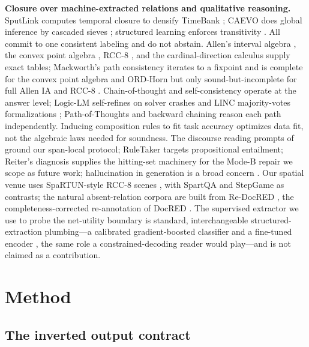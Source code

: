 \documentclass[11pt,letterpaper]{article}
\begin{document}
\textbf{Closure over machine-extracted relations and qualitative reasoning.} SputLink computes temporal closure to densify TimeBank \citep{Verhagen2005}; CAEVO does global inference by cascaded sieves \citep{Chambers2014}; structured learning enforces transitivity \citep{Ning2017}. All commit to one consistent labeling and do not abstain. Allen's interval algebra \citep{Allen1983}, the convex point algebra \citep{Vilain1986}, RCC-8 \citep{Randell1992}, and the cardinal-direction calculus \citep{Frank1996, Ligozat1998} supply exact tables; Mackworth's path consistency \citep{Mackworth1977} iterates to a fixpoint and is complete for the convex point algebra and ORD-Horn \citep{Nebel1994} but only sound-but-incomplete for full Allen IA and RCC-8 \citep{Renz1999}. Chain-of-thought \citep{Wei2022} and self-consistency \citep{Wang2022} operate at the answer level; Logic-LM self-refines on solver crashes \citep{Pan2023} and LINC majority-votes formalizations \citep{Olausson2023}; Path-of-Thoughts \citep{Zhang2024} and backward chaining \citep{Kazemi2022} reason each path independently. Inducing composition rules to fit task accuracy \citep{Zhang2023, Zhu2023} optimizes data fit, not the algebraic laws needed for soundness. The discourse reading prompts of \citet{Wei2024} ground our span-local protocol; RuleTaker \citep{Clark2020} targets propositional entailment; Reiter's diagnosis \citep{Reiter1986} supplies the hitting-set machinery for the Mode-B repair we scope as future work; hallucination in generation is a broad concern \citep{Ji2022}. Our spatial venue uses SpaRTUN-style RCC-8 scenes \citep{Mirzaee2022}, with SpartQA \citep{Mirzaee2021} and StepGame \citep{Shi2022} as contrasts; the natural absent-relation corpora are built from Re-DocRED \citep{Tan2022}, the completeness-corrected re-annotation of DocRED \citep{Yao2019}. The supervised extractor we use to probe the net-utility boundary is standard, interchangeable structured-extraction plumbing---a calibrated gradient-boosted classifier \citep{Ke2017} and a fine-tuned encoder \citep{He2021}, the same role a constrained-decoding reader \citep{Geng2023} would play---and is not claimed as a contribution.

\section{Method}
\label{sec:method}

\subsection{The inverted output contract}
\end{document}
